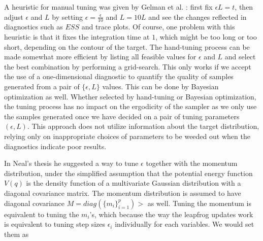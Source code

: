 \documentclass[]{report}
\begin{document}
A heuristic for manual tuning was given by Gelman et al.
\cite{gelman2014bayesian}: first fix $\epsilon L = t$, then adjust $\epsilon$
and $L$ by setting $\epsilon = \frac{\epsilon}{10} $ and $L = 10L$ and see the
changes reflected in diagnostics such as $ESS$ and trace plots. Of course, one
problem with this heuristic is that it fixes the integration time at $1$, which
might be too long or too short, depending on the contour of the target. The hand-tuning process can be made somewhat more efficient by listing all feasible values
for $\epsilon$ and $L$ and select the best combination by performing a grid-search. This only works if we accept
the use of a one-dimensional diagnostic to quantify the quality of samples
generated from a pair of $\{\epsilon,L\}$ values. This can be done by Bayesian
optimization as well. Whether selected by hand-tuning or Bayesian optimization,
the tuning process has no impact on the ergodicity of the sampler as we only
use the samples generated once we have decided on a pair of tuning parameters
$(\epsilon,L)$. This approach does not utilize information about the target
distribution, relying only on inappropriate choices of parameters to be weeded
out when the diagnostics indicate poor results.

In Neal's thesis \cite{neal1996sampling} he suggested a way to tune $\epsilon$ together with the
momentum distribution,  under the simplified assumption that the potential
energy function $V(q)$ is the density function of a multivariate Gaussian distribution
with a diagonal
covariance matrix. The momentum distribution is assumed to have diagonal
covariance $M= diag(\{m_i\}_{i=1}^p)>$ as well. Tuning the momentum is
equivalent to tuning the $m_i$'s, which because the way the leapfrog updates
work is equivalent to tuning step sizes $\epsilon_i$ individually for each
variables. We would set them as
\end{document}
